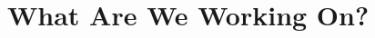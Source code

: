 \documentclass{article}
\begin{document}
%
%
%
%
%
%
%
%
%
%
%
%
%

\newpage

\section*{What Are We Working On?}
\end{document}
